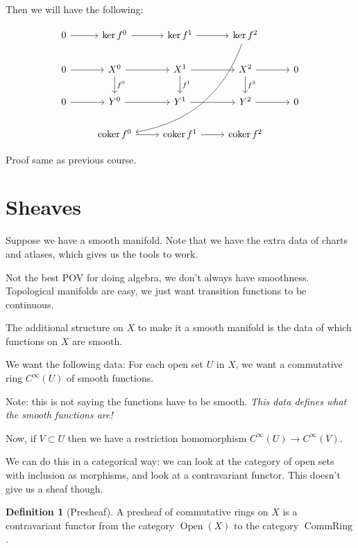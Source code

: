 \documentclass{article}
\theoremstyle{definition}
\newtheorem*{definition}{Definition}
\begin{document}
    Then we will have the following:

    \[
        \begin{tikzcd}
            0 \ar[r] & \ker f^0 \ar[r] & \ker f^1 \ar[r] & \ker f^2 \ar[dddll, bend left] \\
            0 \ar[r] & X^0 \ar[r] \ar[d,"f^0"] & X^1 \ar[r] \ar[d,"f^1"] & X^2 \ar[r] \ar[d,"f^2"] & 0 \\
            0 \ar[r] & Y^0 \ar[r] & Y^1 \ar[r] & Y^2 \ar[r] & 0 \\
            & \operatorname{coker} f^0 \ar[r] & \operatorname{coker} f^1 \ar[r] & \operatorname{coker} f^2 
        \end{tikzcd}
    \]

    Proof same as previous course.

    \section*{Sheaves}
    
    Suppose we have a smooth manifold. Note that we have the extra data of charts and atlases, which gives us the tools to work.

    Not the best POV for doing algebra, we don't always have smoothness. Topological manifolds are easy, we just want transition functions to be continuous.

    The additional structure on \(X\) to make it a smooth manifold is the data of which functions on \(X\) are smooth.

    We want the following data: For each open set \(U\)  in \(X\), we want a commutative ring \(C^{\infty} (U)\) of smooth functions.

    Note: this is not saying the functions have to be smooth. \textit{This data defines what the smooth functions are!}

    Now, if \(V \subset U\) then we have a restriction homomorphism \(C^{\infty} (U) \to C^{\infty} (V)\).

    We can do this in a categorical way: we can look at the category of open sets with inclusion as morphisms, and look at a contravariant functor. This doesn't give us a sheaf though.

    \begin{definition}
        [Presheaf] A presheaf of commutative rings on \(X\) is a contravariant functor from the category \(\operatorname{Open}(X)\) to the category \(\operatorname{CommRing}\).
    \end{definition}
\end{document}
